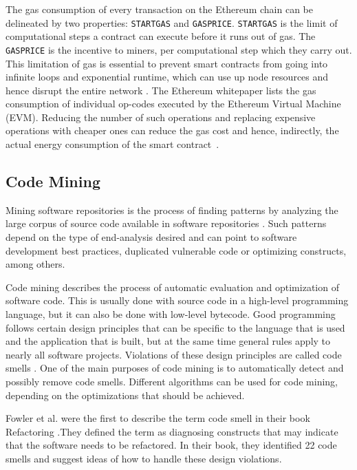 \documentclass[10pt,conference]{IEEEtran}
\begin{document}
	The gas consumption of every transaction on the Ethereum chain can be delineated by two properties: \texttt{STARTGAS} and \texttt{GASPRICE}. \texttt{STARTGAS} is the limit of computational steps a contract can execute before it runs out of gas. The \texttt{GASPRICE} is the incentive to miners, per computational step which they carry out. This limitation of gas is essential to prevent smart contracts from going into infinite loops and exponential runtime, which can use up node resources and hence disrupt the entire network \cite{ethpaper}. The Ethereum whitepaper \cite{ethpaper} lists the gas consumption of individual op-codes executed by the Ethereum Virtual Machine (EVM). Reducing the number of such operations and replacing expensive operations with cheaper ones can reduce the gas cost and hence, indirectly, the actual energy consumption of the smart contract~\cite{contractenergyconsumptionthesis}.
	
	\subsection{Code Mining}
	Mining software repositories is the process of finding patterns by analyzing the large corpus of source code available in software repositories \cite{msrllm}. Such patterns depend on the type of end-analysis desired and can point to software development best practices, duplicated vulnerable code or optimizing constructs, among others.
	
	Code mining describes the process of automatic evaluation and optimization of software code. This is usually done with source code in a high-level programming language, but it can also be done with low-level bytecode. Good programming follows certain design principles that can be specific to the language that is used and the application that is built, but at the same time general rules apply to nearly all software projects. Violations of these design principles are called code smells \cite{codesmellmining}. One of the main purposes of code mining is to automatically detect and possibly remove code smells. Different algorithms can be used for code mining, depending on the optimizations that should be achieved.
	
	Fowler et al. were the first to describe the term code smell in their book Refactoring \cite{refactoring}.They defined the term as diagnosing constructs that may indicate that the software needs to be refactored. In their book, they identified 22 code smells and suggest ideas of how to handle these design violations.
	
\end{document}
